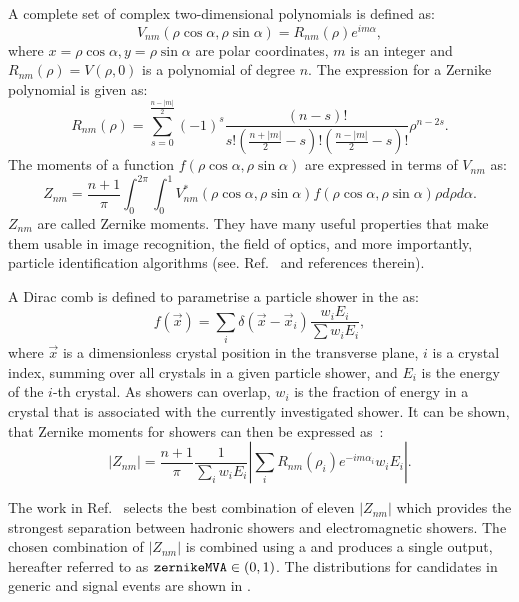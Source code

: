 A complete set of complex two-dimensional polynomials is defined as:
\begin{equation}
    V_{nm}(\rho\cos\alpha,\rho\sin\alpha) = R_{nm}(\rho)e^{im\alpha},
\end{equation}
where ${x=\rho\cos\alpha, y=\rho\sin\alpha}$ are polar coordinates, $m$ is an integer and $R_{nm}(\rho)=V(\rho,0)$ is a polynomial of degree $n$.
The expression for a Zernike polynomial is given as:
\begin{equation}
    R_{nm}(\rho) = \sum^{\frac{n-|m|}{2}}_{s=0}(-1)^s \frac{(n-s)!}{ s! \left(\frac{n+|m|}{2}-s \right) ! \left( \frac{n-|m|}{2}-s\right) !}\rho^{n-2s}.
\end{equation}
The moments of a function $f(\rho\cos\alpha,\rho\sin\alpha)$ are expressed in terms of $V_{nm}$ as:
\begin{equation}
    Z_{nm} = \frac{n+1}{\pi} \int_0^{2\pi}\int^1_0 V^*_{nm}(\rho\cos\alpha,\rho\sin\alpha)f(\rho\cos\alpha, \rho\sin\alpha)\rho d\rho d\alpha.
\end{equation}
$Z_{nm}$ are called Zernike moments.
They have many useful properties that make them usable in image recognition, the field of optics, and more importantly, particle identification algorithms (see. Ref.~\cite{Hershenhorn:2468} and references therein).

A Dirac comb is defined to parametrise a particle shower in the \ECL as:
\begin{equation}
    f(\vec{x}) = \sum_i \delta(\vec{x}-\vec{x}_i)\frac{w_iE_i}{\sum w_iE_i},
\end{equation}
where $\vec{x}$ is a dimensionless crystal position in the transverse plane, $i$ is a crystal index, summing over all crystals in a given particle shower, and $E_i$ is the energy of the $i$-th crystal.
As showers can overlap, $w_i$ is the fraction of energy in a crystal that is associated with the currently investigated shower.
It can be shown, that Zernike moments for \ECL showers can then be expressed as~\cite{Hershenhorn:2468}:
\begin{equation}
    |Z_{nm}| = \frac{n+1}{\pi}\frac{1}{\sum_iw_iE_i}\left|\sum_iR_{nm}(\rho_i)e^{-im\alpha_i}w_iE_i\right|.
\end{equation}

The work in Ref.~\cite{Hershenhorn:2468} selects the best combination of eleven $|Z_{nm}|$ which provides the strongest separation between hadronic showers and electromagnetic showers.
The chosen combination of $|Z_{nm}|$ is combined using a \BDT and produces a single output, hereafter referred to as ${\texttt{zernikeMVA}}\in(0,1)$.
The \ZMVA distributions for \BtoXsgamma candidates in generic \MC and signal \MC events are shown in .

